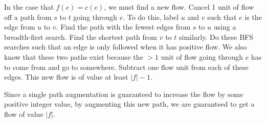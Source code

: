 \documentclass{article}
\begin{document}
In the case that $f(e) = c(e)$, we must find a new flow. Cancel 1 unit of flow
off a path from $s$ to $t$ going through $e$. To do this, label $u$ and $v$
such that $e$ is the edge from $u$ to $v$. Find the path with
the fewest edges from $s$ to $u$ using a breadth-first search. Find the
shortest path from $v$ to $t$ similarly. Do these BFS searches such that an
edge is only followed when it has positive flow. We also know that these two
paths exist because the $> 1$ unit of flow going through $e$ has to come from
and go to somewhere. Subtract one flow unit from each of these edges. This new
flow is of value at least $|f| - 1$.

Since a single path augmentation is guaranteed to increase the flow by some
positive integer value, by augmenting this new path, we are guaranteed to get
a flow of value $|f|$.
\end{document}
